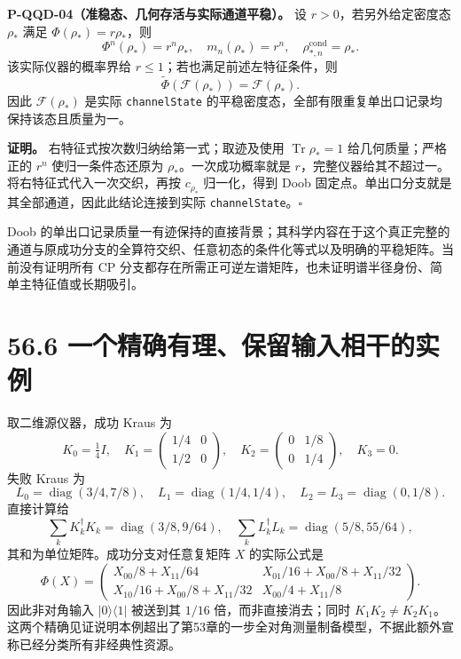 \documentclass[
  11pt,
  oneside]{book}
\begin{document}
\protect\hypertarget{p-qqd-04}{}{}

\textbf{P-QQD-04（准稳态、几何存活与实际通道平稳）。} 设
\(r>0\)，若另外给定密度态 \(\rho_*\) 满足 \(\Phi(\rho_*)=r\rho_*\)，则
\[
\Phi^n(\rho_*)=r^n\rho_*,\quad m_n(\rho_*)=r^n,
\quad \rho_{*,n}^{\mathrm{cond}}=\rho_*.
\] 该实际仪器的概率界给 \(r\le1\)；若也满足前述左特征条件，则 \[
\widetilde\Phi(\mathcal F(\rho_*))=\mathcal F(\rho_*).
\] 因此 \(\mathcal F(\rho_*)\) 是实际 \texttt{channelState}
的平稳密度态，全部有限重复单出口记录均保持该态且质量为一。

\textbf{证明。} 右特征式按次数归纳给第一式；取迹及使用
\(\operatorname{Tr}\rho_*=1\) 给几何质量；严格正的 \(r^n\)
使归一条件态还原为 \(\rho_*\)。一次成功概率就是
\(r\)，完整仪器给其不超过一。将右特征式代入一次交织，再按 \(c_{\rho_*}\)
归一化，得到 Doob 固定点。单出口分支就是其全部通道，因此此结论连接到实际
\texttt{channelState}。\(\square\)

Doob
的单出口记录质量一有迹保持的直接背景；其科学内容在于这个真正完整的通道与原成功分支的全算符交织、任意初态的条件化等式以及明确的平稳矩阵。当前没有证明所有
CP
分支都存在所需正可逆左谱矩阵，也未证明谱半径身份、简单主特征值或长期吸引。

\hypertarget{ux4e00ux4e2aux7cbeux786eux6709ux7406ux4fddux7559ux8f93ux5165ux76f8ux5e72ux7684ux5b9eux4f8b}{%
\section{56.6
一个精确有理、保留输入相干的实例}\label{ux4e00ux4e2aux7cbeux786eux6709ux7406ux4fddux7559ux8f93ux5165ux76f8ux5e72ux7684ux5b9eux4f8b}}

取二维源仪器，成功 Kraus 为 \[
K_0=\tfrac14I,\quad
K_1=\begin{pmatrix}1/4&0\\1/2&0\end{pmatrix},\quad
K_2=\begin{pmatrix}0&1/8\\0&1/4\end{pmatrix},\quad K_3=0.
\] 失败 Kraus 为 \[
L_0=\operatorname{diag}(3/4,7/8),\quad
L_1=\operatorname{diag}(1/4,1/4),\quad
L_2=L_3=\operatorname{diag}(0,1/8).
\] 直接计算给 \[
\sum_kK_k^\dagger K_k=\operatorname{diag}(3/8,9/64),
\quad \sum_kL_k^\dagger L_k=\operatorname{diag}(5/8,55/64),
\] 其和为单位矩阵。成功分支对任意复矩阵 \(X\) 的实际公式是 \[
\Phi(X)=\begin{pmatrix}
X_{00}/8+X_{11}/64&X_{01}/16+X_{00}/8+X_{11}/32\\
X_{10}/16+X_{00}/8+X_{11}/32&X_{00}/4+X_{11}/8
\end{pmatrix}.
\] 因此非对角输入 \(|0\rangle\langle1|\) 被送到其 \(1/16\)
倍，而非直接消去；同时
\(K_1K_2\ne K_2K_1\)。这两个精确见证说明本例超出了第53章的一步全对角测量制备模型，不据此额外宣称已经分类所有非经典性资源。
\end{document}
